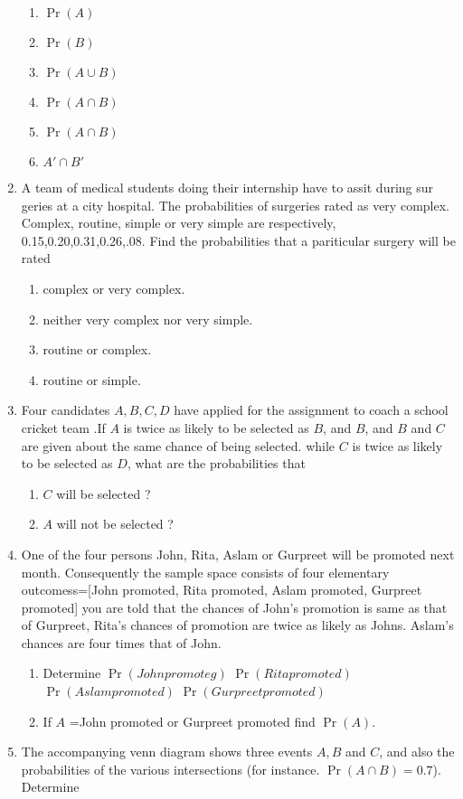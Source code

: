 \documentclass[12pt]{article}
\providecommand{\pr}[1]{\ensuremath{\Pr\left(#1\right)}}
\begin{document}
\begin{enumerate}
\begin{enumerate}
\item $\pr{A}$
\item $\pr{B}$
\item $\pr{A\cup B}$
\item $\pr{A\cap B}$
\item $\pr{A\cap B}$
\item ${A\prime\cap B\prime}$
\end{enumerate}
\item A team of medical students doing their internship have to assit during sur geries at a city hospital. The probabilities of surgeries rated as very complex. Complex, routine, simple or very simple are respectively, 0.15,0.20,0.31,0.26,.08. Find the probabilities that a pariticular surgery will be rated
\begin{enumerate}
\item complex or very complex.
\item neither very complex nor very simple.
\item routine or complex. 
\item routine or simple.
\end{enumerate}
\item Four candidates $A,B,C,D$ have applied for the assignment to coach a school cricket team .If $A$ is twice as likely to be selected as $B$, and $B$, and $B$ and $C$ are given about the same chance of being selected. while $C$ is twice as likely to be selected as $D$, what are the probabilities that
\begin{enumerate}
\item $C$ will be selected ?
\item $A$ will not be selected ?
\end{enumerate}
\item One of the four persons John, Rita, Aslam or Gurpreet will be promoted next month. Consequently the sample space consists of four elementary outcomess=[John promoted, Rita promoted, Aslam promoted, Gurpreet promoted] you are told that the chances of John's promotion is same as that of Gurpreet, Rita's chances of promotion are twice as likely as Johns. Aslam's chances are four times that of John.
\begin{enumerate}
\item Determine $\pr{John promoteg}$
$\pr{Rita promoted}$
$\pr{Aslam promoted}$
$\pr{Gurpreet promoted}$
\item If $A$ ={John promoted or Gurpreet promoted} find $\pr{A}$.
\end{enumerate}
\item The accompanying venn diagram shows three events $A,B$ and $C$, and also the probabilities of the various intersections (for instance. $\pr {A\cap B} =0.7$). Determine

\end{enumerate}
\end{document}
